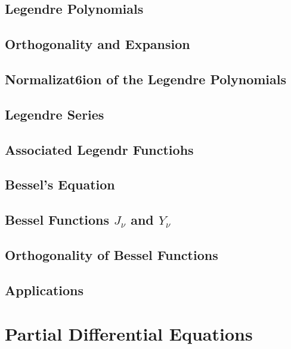 \documentclass[11pt, letterpaper]{article}
\theoremstyle{plain}
\begin{document}
\subsection{Legendre Polynomials}



\subsection{Orthogonality and Expansion}

\subsection{Normalizat6ion of the Legendre Polynomials}

\subsection{Legendre Series}
\subsection{Associated Legendr Functiohs}

\subsection{Bessel's Equation}



\subsection{Bessel Functions \(J_\nu\) and \(Y_\nu\)}



\subsection{Orthogonality of Bessel Functions}



\subsection{Applications}



\newpage
\section{Partial Differential Equations}        %
\end{document}
